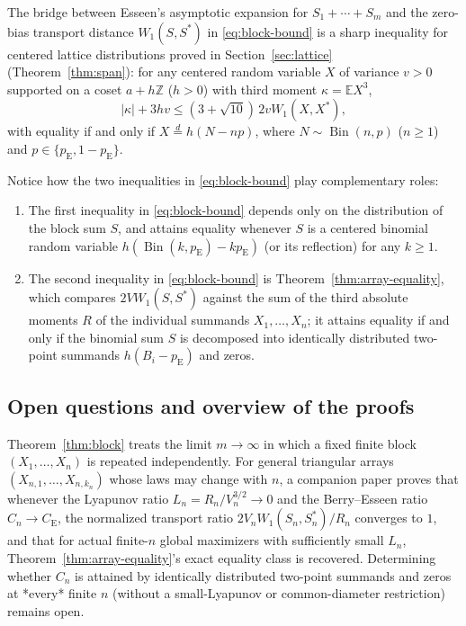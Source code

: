 \documentclass[11pt]{article}
\numberwithin{equation}{section}
\theoremstyle{remark}
\DeclareMathOperator{\Bin}{Bin}
\newcommand{\E}{\mathbb E}
\newcommand{\Z}{\mathbb Z}
\newcommand{\ce}{C_{\mathrm E}}
\begin{document}
The bridge between Esseen's asymptotic expansion for $S_1+\cdots+S_m$ and the
zero-bias transport distance $W_1(S,S^*)$ in \eqref{eq:block-bound} is a
sharp inequality for centered lattice distributions proved in
Section~\ref{sec:lattice} (Theorem~\ref{thm:span}): for any centered random
variable $X$ of variance $v>0$ supported on a coset $a+h\Z$ ($h>0$) with
third moment $\kappa=\E X^3$,
\[
 |\kappa|+3hv\le(3+\sqrt{10})\,2vW_1(X,X^*),
\]
with equality if and only if $X\stackrel d=h(N-np)$, where $N\sim\Bin(n,p)$
($n\ge1$) and $p\in\{p_{\mathrm E},1-p_{\mathrm E}\}$.

Notice how the two inequalities in \eqref{eq:block-bound} play complementary
roles:
\begin{enumerate}[label=(\roman*),leftmargin=2em]
\item The first inequality in \eqref{eq:block-bound} depends only on the
distribution of the block sum $S$, and attains equality whenever $S$ is a
centered binomial random variable $h(\Bin(k,p_{\mathrm E})-kp_{\mathrm E})$
(or its reflection) for any $k\ge1$.
\item The second inequality in \eqref{eq:block-bound} is
Theorem~\ref{thm:array-equality}, which compares $2VW_1(S,S^*)$ against the
sum of the third absolute moments $R$ of the individual summands $X_1,\ldots,X_n$;
it attains equality if and only if the binomial sum $S$ is decomposed into
identically distributed two-point summands $h(B_i-p_{\mathrm E})$ and zeros.
\end{enumerate}

\subsection{Open questions and overview of the proofs}

Theorem~\ref{thm:block} treats the limit $m\to\infty$ in which a fixed
finite block $(X_1,\ldots,X_n)$ is repeated independently. For general
triangular arrays $(X_{n,1},\ldots,X_{n,k_n})$ whose laws may change with $n$,
a companion paper \citep[Theorem~1.1]{BellSmallStructure2026} proves that
whenever the Lyapunov ratio $L_n=R_n/V_n^{3/2}\to0$ and the Berry--Esseen
ratio $C_n\to\ce$, the normalized transport ratio $2V_nW_1(S_n,S_n^*)/R_n$
converges to $1$, and that for actual finite-$n$ global maximizers with
sufficiently small $L_n$, Theorem~\ref{thm:array-equality}'s exact equality
class is recovered. Determining whether $C_n$ is attained by identically
distributed two-point summands and zeros at *every* finite $n$ (without a
small-Lyapunov or common-diameter restriction) remains open.
\end{document}
